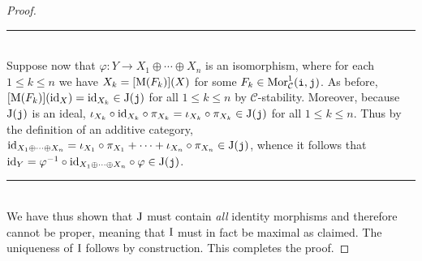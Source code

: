 \begin{proof}
\begin{center}
\rule{0.5\linewidth}{1pt}
\end{center}
\noindent\\[-\baselineskip]
\noindent Suppose now that $\varphi : Y \to X_1 \oplus \cdots \oplus X_n$ is an isomorphism, where for each  $1 \leq k \leq n$ we have $X_k = [\textnormal{M}(F_k)](X)$ for some $F_k \in \textnormal{Mor}_\mathcal{C}^1(\textnormal{\texttt{i}}, \textnormal{\texttt{j}})$. As before, $[\textnormal{M}(F_k)](\textnormal{id}_X) = \textnormal{id}_{X_k} \in \textnormal{J}(\textnormal{\texttt{j}})$ for all $1 \leq k \leq n$ by $\mathscr{C}$-stability. Moreover, because $\textnormal{J}(\textnormal{\texttt{j}})$ is an ideal, $\iota_{X_k} \circ \textnormal{id}_{X_k} \circ \pi_{X_k} = \iota_{X_k} \circ \pi_{X_k} \in \textnormal{J}(\textnormal{\texttt{j}})$ for all $1 \leq k \leq n$. Thus by the definition of an additive category, $\textnormal{id}_{X_1 \oplus \cdots \oplus X_n} = \iota_{X_1} \circ \pi_{X_1} + \cdots + \iota_{X_n} \circ \pi_{X_n} \in \textnormal{J}(\textnormal{\texttt{j}})$, whence it follows that $\textnormal{id}_Y = \varphi^{-1} \circ \textnormal{id}_{X_1 \oplus \cdots \oplus X_n} \circ \varphi \in \textnormal{J}(\textnormal{\texttt{j}})$.\\[-1.5\baselineskip]
\begin{center}
\rule{0.5\linewidth}{1pt}
\end{center}
\noindent\\[-\baselineskip]
\noindent We have thus shown that $\textnormal{J}$ must contain {\em all} identity morphisms and therefore cannot be proper, meaning that $\textnormal{I}$ must in fact be maximal as claimed. The uniqueness of $\textnormal{I}$ follows by construction. This completes the proof.
\end{proof}\newpage

